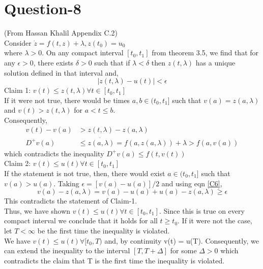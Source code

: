 \documentclass{article}
\begin{document}
\section*{Question-8}
(From Hassan Khalil Appendix C.2) \\
Consider $\dot{z} = f(t,z) + \lambda, z(t_0) = u_0$ \\
where $\lambda>0$. On any compact interval $[t_0,t_1]$ from theorem 3.5, we find that for any $\epsilon>0$, there exists $\delta>0$ such that if $\lambda<\delta$ then $z(t,\lambda)$ has a unique solution defined in that interval and,
\begin{equation}
    |z(t,\lambda)-u(t)| < \epsilon \label{C6}
\end{equation}
Claim 1: $v(t) \leq z(t,\lambda) \forall t \in [t_0,t_1]$ \\
If it were not true, there would be times $a,b \in (t_0,t_1]$ such that $v(a) = z(a,\lambda)$ and $v(t) > z(t,\lambda) $ for $a<t\leq b$. \\
Consequently,
\begin{align*}
    v(t) - v(a) &> z(t,\lambda) -  z(a,\lambda) \\
    D^+v(a) &\leq \dot{z(a,\lambda)} = f(a,z(a,\lambda)) + \lambda > f(a,v(a))
\end{align*}
which contradicts the inequality $D^+v(a) \leq f(t,v(t))$ \\
Claim 2: $v(t)\leq u(t) \forall t \in [t_0,t_1]$ \\
If the statement is not true, then, there would exist $a\in(t_0,t_1]$ such that $v(a)>u(a)$. Taking $\epsilon = [v(a) - u(a)]/2$ and using eqn \ref{C6},
\begin{equation}
    v(a) - z(a,\lambda) = v(a) - u(a) + u(a) - z(a,\lambda) \geq \epsilon 
\end{equation}
This contradicts the statement of Claim-1. \\
Thus, we have shown $v(t)\leq u(t) \forall t \in [t_0,t_1]$. Since this is true on every compact interval we conclude that it holds for all $t\geq t_0$. If it were not the case, let $T<\infty$ be the first time the inequality is violated. \\
We have $v(t)\leq u(t)\forall [t_0,T)$ and, by continuity v(t) = u(T). Consequently, we can extend the inequality to the interval $[T,T+\Delta]$ for some $\Delta>0$ which contradicts the claim that T is the first time the inequality is violated.
\end{document}
